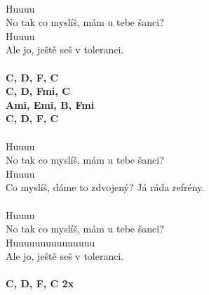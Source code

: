 \begin{multicols}{2}
\\
\color{black}
Huuuu\\
\color{red}
No tak co myslíš, mám u tebe šanci?\\
\color{black}
Huuuu\\
\color{blue}
Ale jo, ještě seš v toleranci.\\
\columnbreak
\\
\color{black}
\footnotesize\textbf{C, D\7, F, C\\
C, D\7, Fmi, C\\
Ami, Emi, B\be, Fmi\\
C, D\7, F, C}\\
\\
\normalsize
Huuuu\\
No tak co myslíš, mám u tebe šanci?\\
Huuuu\\
\color{blue}
Co myslíš, \textcolor{black}{}dáme to \textcolor{black}{}zdvojený? \color{red} \textcolor{black}{}Já ráda \textcolor{black}{}refrény.\\
\\
\color{black}
Huuuu\\
No tak co myslíš, mám u tebe šanci?\\
Huuuuuuuuuuuuuuu\\
Ale jo, ještě seš v toleranci.\\ 
\\
\footnotesize\textbf{C, D\7, F, C 2x}\\
\normalsize
\end{multicols}